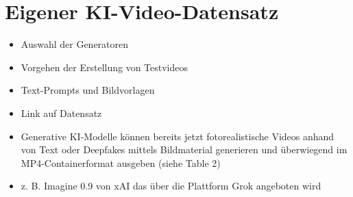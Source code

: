 


\section{Eigener KI-Video-Datensatz}

\begin{itemize}
    \item Auswahl der Generatoren
    \item Vorgehen der Erstellung von Testvideos
    \item Text-Prompts und Bildvorlagen
    \item Link auf Datensatz
    \item Generative KI-Modelle können bereits jetzt fotorealistische Videos anhand von Text oder Deepfakes mittels Bildmaterial generieren und überwiegend im MP4-Containerformat ausgeben (siehe Table 2)
    \item z. B. Imagine 0.9 von xAI das über die Plattform Grok angeboten wird
\end{itemize}


